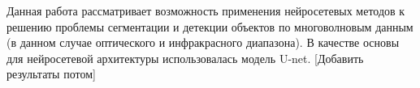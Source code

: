 \Annotation

Данная работа рассматривает возможность применения нейросетевых методов к решению проблемы 
сегментации и детекции объектов по многоволновым данным (в данном случае оптического и 
инфракрасного диапазона). В качестве основы для нейросетевой архитектуры использовалась модель 
U-net. [Добавить результаты потом]
